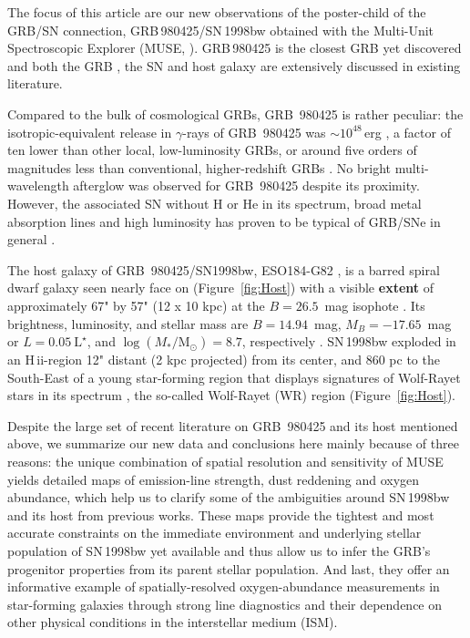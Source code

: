 \documentclass[traditabstract]{aa}
\newcommand{\hii}{\mbox{H\,{\sc ii}}}
\begin{document}
The focus of this article are our new observations of the poster-child of the GRB/SN connection, GRB\,980425/SN\,1998bw obtained with the Multi-Unit Spectroscopic Explorer (MUSE, \citealp{2010SPIE.7735E..08B}). GRB\,980425 is the closest GRB yet discovered and both the GRB \citep[e.g.][]{1998Natur.395..670G, 1998Natur.395..663K}, the SN \citep[e.g.][]{1998Natur.395..672I, 2001ApJ...555..900P, 2006ApJ...640..854M} and host galaxy \citep[e.g.][]{2000ApJ...542L..89F, 2005NewA...11..103S, 2006A&A...454..103H, 2009ApJ...693..347M, 2014A&A...562A..70M, 2016arXiv160901742M} are extensively discussed in existing literature. 

Compared to the bulk of cosmological GRBs, GRB~980425 is rather peculiar: the isotropic-equivalent release in $\gamma$-rays of GRB~980425 was $\sim10^{48}$\,erg \citep{1998Natur.395..670G}, a factor of ten lower than other local, low-luminosity GRBs, or around five orders of magnitudes less than conventional, higher-redshift GRBs \citep{2013ApJ...776...98X}. No bright multi-wavelength afterglow was observed for GRB~980425 despite its proximity. However, the associated SN without H or He in its spectrum, broad metal absorption lines and high luminosity has proven to be typical of GRB/SNe in general \citep{2012grbu.book..169H}.

The host galaxy of GRB~980425/SN1998bw, ESO184-G82 \citep{1989spce.book.....L}, is a barred spiral dwarf galaxy \citep{2000ApJ...542L..89F} seen nearly face on (Figure~\ref{fig:Host}) with a visible \textbf{extent} of approximately 67" by 57" (12 x 10 kpc) at the $B=26.5$~mag isophote \citep{2005NewA...11..103S}. Its brightness, luminosity, and stellar mass are $B=14.94$~mag, $M_B=-17.65$~mag or $L=0.05~\mathrm{L}^{\star}$, and $\log (M_{*}/\mathrm{M}_{\odot})= 8.7 $, respectively \citep{2005NewA...11..103S, 2014A&A...562A..70M}. SN\,1998bw exploded in an \hii-region 12" distant (2 kpc projected) from its center, and 860 pc to the South-East of a young star-forming region that displays signatures of Wolf-Rayet stars in its spectrum \citep{2006A&A...454..103H}, the so-called Wolf-Rayet (WR) region (Figure~\ref{fig:Host}).

Despite the large set of recent literature on GRB~980425 and its host mentioned above, we summarize our new data and conclusions here mainly because of three reasons: the unique combination of spatial resolution and sensitivity of MUSE yields detailed maps of emission-line strength, dust reddening and oxygen abundance, which help us to clarify some of the ambiguities around SN\,1998bw and its host from previous works. These maps provide the tightest and most accurate constraints on the immediate environment and underlying stellar population of SN\,1998bw yet available and thus allow us to infer the GRB's progenitor properties from its parent stellar population. And last, they offer an informative example of spatially-resolved oxygen-abundance measurements in star-forming galaxies through strong line diagnostics and their dependence on other physical conditions in the interstellar medium (ISM).
\end{document}
